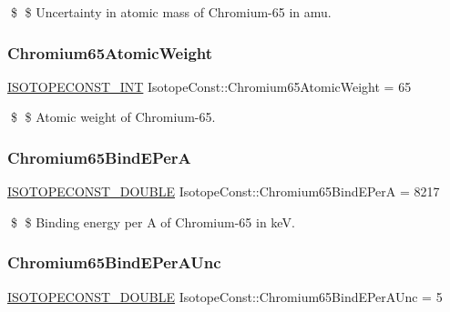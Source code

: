 \$ \$ Uncertainty in atomic mass of Chromium-\/65 in amu. \mbox{\label{group___isotope_const-_chromium-_cr65_gaa58f05513adc01178df5a84c02ef4284}} 
\subsubsection{\texorpdfstring{Chromium65\+Atomic\+Weight}{Chromium65AtomicWeight}}
{\footnotesize\ttfamily \mbox{\hyperlink{group___isotope_const-_macros_ga5f18360b3e99483a35c32d789e62621c}{I\+S\+O\+T\+O\+P\+E\+C\+O\+N\+S\+T\+\_\+\+I\+NT}} Isotope\+Const\+::\+Chromium65\+Atomic\+Weight = 65}

\$ \$ Atomic weight of Chromium-\/65. \mbox{\label{group___isotope_const-_chromium-_cr65_ga2a767013aa30f48d9e5ef3131f32e2db}} 
\subsubsection{\texorpdfstring{Chromium65\+Bind\+E\+PerA}{Chromium65BindEPerA}}
{\footnotesize\ttfamily \mbox{\hyperlink{group___isotope_const-_macros_ga8f45a7272ce02c0b4c65c44636ed719a}{I\+S\+O\+T\+O\+P\+E\+C\+O\+N\+S\+T\+\_\+\+D\+O\+U\+B\+LE}} Isotope\+Const\+::\+Chromium65\+Bind\+E\+PerA = 8217}

\$ \$ Binding energy per A of Chromium-\/65 in keV. \mbox{\label{group___isotope_const-_chromium-_cr65_ga85593c6351adc326e7d1bfcef24f9985}} 
\subsubsection{\texorpdfstring{Chromium65\+Bind\+E\+Per\+A\+Unc}{Chromium65BindEPerAUnc}}
{\footnotesize\ttfamily \mbox{\hyperlink{group___isotope_const-_macros_ga8f45a7272ce02c0b4c65c44636ed719a}{I\+S\+O\+T\+O\+P\+E\+C\+O\+N\+S\+T\+\_\+\+D\+O\+U\+B\+LE}} Isotope\+Const\+::\+Chromium65\+Bind\+E\+Per\+A\+Unc = 5}

